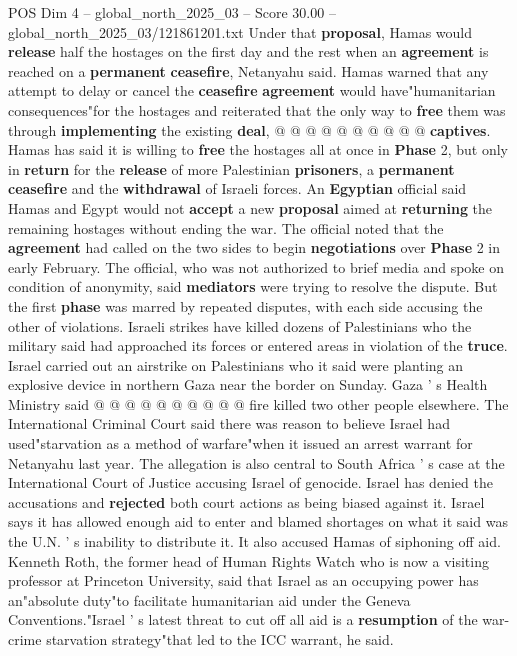 \begin{textsample}{POS Dim 4 – global\_north\_2025\_03 – Score 30.00 – global\_north\_2025\_03/121861201.txt}
Under that \textbf{proposal}, Hamas would \textbf{release} half the hostages on the first day and the rest when an \textbf{agreement} is reached on a \textbf{permanent} \textbf{ceasefire}, Netanyahu said.
Hamas warned that any attempt to delay or cancel the \textbf{ceasefire} \textbf{agreement} would have"humanitarian consequences"for the hostages and reiterated that the only way to \textbf{free} them was through \textbf{implementing} the existing \textbf{deal}, @ @ @ @ @ @ @ @ @ @ \textbf{captives}.
Hamas has said it is willing to \textbf{free} the hostages all at once in \textbf{Phase} 2, but only in \textbf{return} for the \textbf{release} of more Palestinian \textbf{prisoners}, a \textbf{permanent} \textbf{ceasefire} and the \textbf{withdrawal} of Israeli forces.
An \textbf{Egyptian} official said Hamas and Egypt would not \textbf{accept} a new \textbf{proposal} aimed at \textbf{returning} the remaining hostages without ending the war.
The official noted that the \textbf{agreement} had called on the two sides to begin \textbf{negotiations} over \textbf{Phase} 2 in early February.
The official, who was not authorized to brief media and spoke on condition of anonymity, said \textbf{mediators} were trying to resolve the dispute.
But the first \textbf{phase} was marred by repeated disputes, with each side accusing the other of violations.
Israeli strikes have killed dozens of Palestinians who the military said had approached its forces or entered areas in violation of the \textbf{truce}.
Israel carried out an airstrike on Palestinians who it said were planting an explosive device in northern Gaza near the border on Sunday.
Gaza ' s Health Ministry said @ @ @ @ @ @ @ @ @ @ fire killed two other people elsewhere.
The International Criminal Court said there was reason to believe Israel had used"starvation as a method of warfare"when it issued an arrest warrant for Netanyahu last year.
The allegation is also central to South Africa ' s case at the International Court of Justice accusing Israel of genocide.
Israel has denied the accusations and \textbf{rejected} both court actions as being biased against it.
Israel says it has allowed enough aid to enter and blamed shortages on what it said was the U.N. ' s inability to distribute it.
It also accused Hamas of siphoning off aid.
Kenneth Roth, the former head of Human Rights Watch who is now a visiting professor at Princeton University, said that Israel as an occupying power has an"absolute duty"to facilitate humanitarian aid under the Geneva Conventions."Israel ' s latest threat to cut off all aid is a \textbf{resumption} of the war-crime starvation strategy"that led to the ICC warrant, he said.

\end{textsample}
